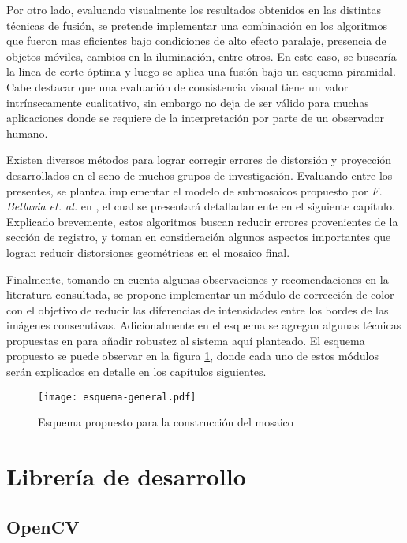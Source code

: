 Por otro lado, evaluando visualmente los resultados obtenidos en las distintas técnicas de fusión, se pretende implementar una combinación en los algoritmos que fueron mas eficientes bajo condiciones de alto efecto paralaje, presencia de objetos móviles, cambios en la iluminación, entre otros. En este caso, se buscaría la linea de corte óptima y luego se aplica una fusión bajo un esquema piramidal. Cabe destacar que una evaluación de consistencia visual tiene un valor intrínsecamente cualitativo, sin embargo no deja de ser válido para muchas aplicaciones donde se requiere de la interpretación por parte de un observador humano.

Existen diversos métodos para lograr corregir errores de distorsión y proyección desarrollados en el seno de muchos grupos de investigación. Evaluando entre los presentes, se plantea implementar el modelo de submosaicos propuesto por \textit{F. Bellavia et. al.} en \cite{bellavia-ransac,bellavia-ref}, el cual se presentará detalladamente en el siguiente capítulo. Explicado brevemente, estos algoritmos buscan reducir errores provenientes de la sección de registro, y toman en consideración algunos aspectos importantes que logran reducir distorsiones geométricas en el mosaico final. 

Finalmente, tomando en cuenta algunas observaciones y recomendaciones en la literatura consultada, se propone implementar un módulo de corrección de color con el objetivo de reducir las diferencias de intensidades entre los bordes de las imágenes consecutivas. Adicionalmente en el esquema se agregan algunas técnicas propuestas en \cite{grid} para añadir robustez al sistema aquí planteado. El esquema propuesto se puede observar en la figura \ref{imagen:esquema}, donde cada uno de estos módulos serán explicados en detalle en los capítulos siguientes.

\begin{figure}[H]
	\centerline{
		\texttt{[image: esquema-general.pdf]}}
		\caption{Esquema propuesto para la construcción del mosaico}
	\label{imagen:esquema}
\end{figure}

\section{Librería de desarrollo}

\subsection{OpenCV}

